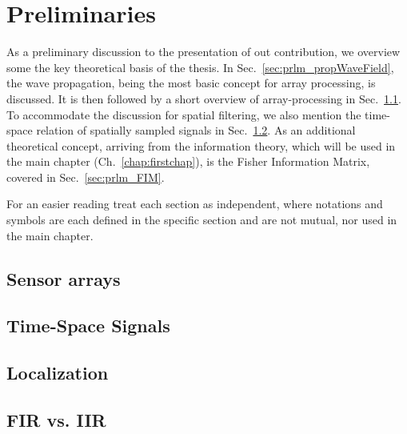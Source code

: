 \chapter{Preliminaries}
\label{chap:prelims}

As a preliminary discussion to the presentation of out contribution, we overview some the key theoretical basis of the thesis.
In Sec.~\ref{sec:prlm_propWaveField}, the wave propagation, being the most basic concept for array processing, is discussed.
It is then followed by a short overview of array-processing in Sec.~\ref{sec:prlm_sensorArrays}.
To accommodate the discussion for spatial filtering, we also mention the time-space relation of spatially sampled signals in Sec.~\ref{sec:prlm_timeSpaceSig}.
As an additional theoretical concept, arriving from the information theory, which will be used in the main chapter (Ch.~\ref{chap:firstchap}), is the Fisher Information Matrix, covered in Sec.~\ref{sec:prlm_FIM}.
\par 
For an easier reading treat each section as independent, where notations and symbols are each defined in the specific section and are not mutual, nor used in the main chapter. 


% 
% 
\section{Sensor arrays}
\label{sec:prlm_sensorArrays}

\section{Time-Space Signals}
\label{sec:prlm_timeSpaceSig}

\section{Localization}
\label{sec:prlm_localization}

% 
\section{FIR vs. IIR}
\label{sec:prlm_FIR_IIR}
